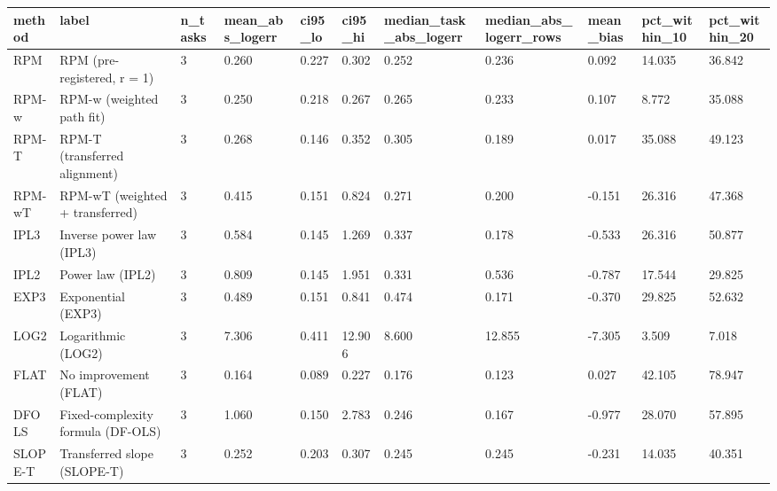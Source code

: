\begin{tabular}{lllllllllll}
\hline
method & label & n\_tasks & mean\_abs\_logerr & ci95\_lo & ci95\_hi & median\_task\_abs\_logerr & median\_abs\_logerr\_rows & mean\_bias & pct\_within\_10 & pct\_within\_20 \\
\hline
RPM & RPM (pre-registered, r = 1) & 3 & 0.260 & 0.227 & 0.302 & 0.252 & 0.236 & 0.092 & 14.035 & 36.842 \\
RPM-w & RPM-w (weighted path fit) & 3 & 0.250 & 0.218 & 0.267 & 0.265 & 0.233 & 0.107 & 8.772 & 35.088 \\
RPM-T & RPM-T (transferred alignment) & 3 & 0.268 & 0.146 & 0.352 & 0.305 & 0.189 & 0.017 & 35.088 & 49.123 \\
RPM-wT & RPM-wT (weighted + transferred) & 3 & 0.415 & 0.151 & 0.824 & 0.271 & 0.200 & -0.151 & 26.316 & 47.368 \\
IPL3 & Inverse power law (IPL3) & 3 & 0.584 & 0.145 & 1.269 & 0.337 & 0.178 & -0.533 & 26.316 & 50.877 \\
IPL2 & Power law (IPL2) & 3 & 0.809 & 0.145 & 1.951 & 0.331 & 0.536 & -0.787 & 17.544 & 29.825 \\
EXP3 & Exponential (EXP3) & 3 & 0.489 & 0.151 & 0.841 & 0.474 & 0.171 & -0.370 & 29.825 & 52.632 \\
LOG2 & Logarithmic (LOG2) & 3 & 7.306 & 0.411 & 12.906 & 8.600 & 12.855 & -7.305 & 3.509 & 7.018 \\
FLAT & No improvement (FLAT) & 3 & 0.164 & 0.089 & 0.227 & 0.176 & 0.123 & 0.027 & 42.105 & 78.947 \\
DFOLS & Fixed-complexity formula (DF-OLS) & 3 & 1.060 & 0.150 & 2.783 & 0.246 & 0.167 & -0.977 & 28.070 & 57.895 \\
SLOPE-T & Transferred slope (SLOPE-T) & 3 & 0.252 & 0.203 & 0.307 & 0.245 & 0.245 & -0.231 & 14.035 & 40.351 \\
\hline
\end{tabular}
